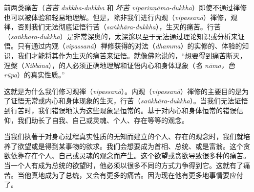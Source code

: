 前两类痛苦（{\it 苦苦 dukkha-dukkha} 和 {\it 坏苦 viparin\d n\=ama-dukkha}）即使不通过禅修也可以被体验和轻易地理解。但是，除非我们进行内观（{\it vipassan\=a}）禅修，观禅，否则我们无法彻底证悟行苦（{\it sa\.nkh\=ara-dukkha}），生灭的痛苦。行苦（{\it sa\.nkh\=ara-dukkha}）是非常深奥的，太深邃以至于无法通过理论知识或分析来证悟。只有通过内观（{\it vipassan\=a}）禅修获得的对法（{\it dhamma}）的实修的、体验的知识，我们才能将其作为生灭的痛苦来证悟。就像佛陀说的，“想要得到痛苦断灭，涅槃（{\it Nibb\=ana}），的人必须正确地理解和证悟内心和身体现象（{\it 名 n\=ama，色 r\=upa}）的真实性质。”

这就是为什么我们修习观禅（{\it vipassan\=a}）。内观（{\it vipassan\=a}）禅修的主要目的是为了证悟无常或内心和身体现象的生灭，行苦（{\it sa\.nkh\=ara-dukkha}）。当我们无法证悟到行苦时，我们错误地认为这些现象是恒常的。基于对内心\1和身体恒常的错误信仰，我们助长了自我、自己或灵魂、个人、存在等等的观念。

当我们执著于对身心过程真实性质的无知而建立的个人、存在的观念时，我们就培养了欲望或是得到某事物的欲求。我们会想要成为首相、总统、或是富翁。这个贪欲依靠存在个人、自己或灵魂的观念而产生。这个欲望或贪欲导致很多种的痛苦。当一个人有成为总统的欲望时，他必须以很多不同的方式力争得到它。这就有了痛苦。当他真地成为了总统，又会有更多的痛苦。因为现在他有更多地事情要应付了。

\endchapter

\byebye
